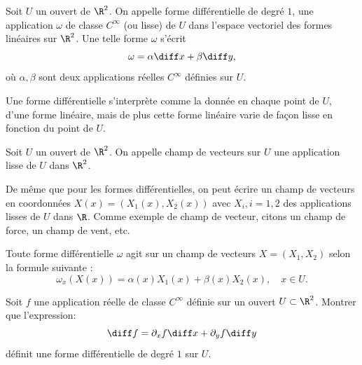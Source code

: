

\begin{fdefn}
Soit $U$ un ouvert de $\R^2$. On appelle forme différentielle de degré $1$, une application $\omega$ de classe $C^\infty$ (ou lisse) de $U$ dans l'espace vectoriel des formes linéaires sur $\R^2$. Une telle forme $\omega$ s'écrit 
\[\omega=\alpha \diff x + \beta \diff y,\]
où $\alpha, \beta$ sont deux applications réelles $C^\infty$ définies sur $U$.
\end{fdefn}

Une forme différentielle s'interprète comme la donnée en chaque point de $U$, d'une forme linéaire, mais de plus cette forme linéaire varie de façon lisse en fonction du point de $U$. 

\begin{fdefn}
Soit $U$ un ouvert de $\R^2$. On appelle champ de vecteurs sur $U$ une application lisse de $U$ dans $\R^2$. 
\end{fdefn}
De même que pour les formes différentielles, on peut écrire un champ de vecteurs en coordonnées $X(x) = (X_1(x), X_2(x))$ avec $X_i, i=1,2$ des applications lisses de $U$ dans $\R$. Comme exemple de champ de vecteur, citons un champ de force, un champ de vent, etc. 

Toute forme différentielle $\omega$ agit sur un champ de vecteurs $X=(X_1,X_2)$ selon la formule suivante :  
\[\omega_x(X(x))=\alpha(x) X_1(x) + \beta(x) X_2(x), \quad x \in U. \]
 
\begin{exercice}
Soit $f$ une application réelle de classe $C^\infty$ définie sur un ouvert $U \subset \R^2$. Montrer que l'expression:
\[
 \diff f = \partial_x f \diff x + \partial_y f  \diff y
\]
définit une forme différentielle de degré $1$ sur $U$.
\end{exercice}

